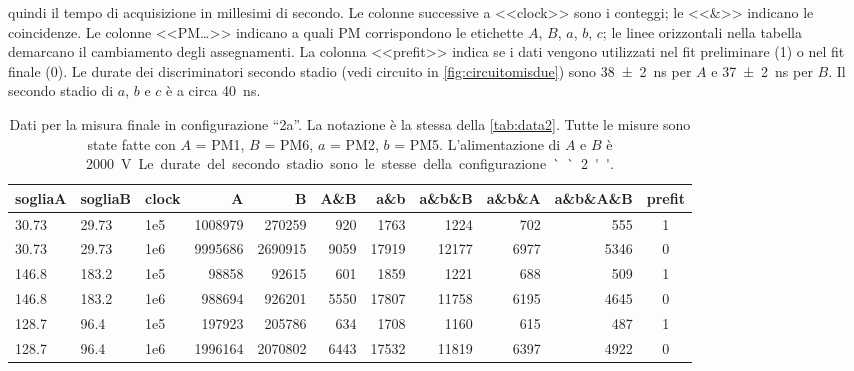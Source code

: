\begin{landscape}
\begin{table}[p]
{		quindi il tempo di acquisizione in millesimi di secondo.
		Le colonne successive a <<clock>> sono i conteggi; le <<\&>> indicano le coincidenze.
		Le colonne <<PM\dots>> indicano a quali PM corrispondono le etichette $A$, $B$, $a$, $b$, $c$;
		le linee orizzontali nella tabella demarcano il cambiamento degli assegnamenti.
		La colonna <<prefit>> indica se i dati vengono utilizzati nel fit preliminare (1) o nel fit finale (0).
		Le durate dei discriminatori secondo stadio (vedi circuito in \autoref{fig:circuitomisdue})
		sono \SI{38\pm2}{ns} per $A$ e \SI{37\pm2}{ns} per $B$.
		Il secondo stadio di $a$, $b$ e $c$ è a circa \SI{40}{ns}.}
	\end{table}
\end{landscape}

\begin{table}[p]
	\small
	\hspace{-5em}
	\begin{tabular}{ll|lrrrrrrr|c}
		sogliaA & sogliaB & clock & A & B & A\&B & a\&b & a\&b\&B & a\&b\&A & a\&b\&A\&B & prefit \\
		\hline
		30.73 & 29.73 & 1e5 & 1008979 & 270259 & 920 & 1763 & 1224 & 702 & 555  & 1               \\
		30.73 & 29.73 & 1e6 & 9995686 & 2690915 & 9059 & 17919 & 12177 & 6977 & 5346 & 0          \\
		146.8 & 183.2 & 1e5 & 98858 & 92615 & 601 & 1859 & 1221 & 688 & 509  & 1                    \\
		146.8 & 183.2 & 1e6 & 988694 & 926201 & 5550 & 17807 & 11758 & 6195 & 4645 & 0              \\
		128.7 & 96.4 & 1e5 & 197923 & 205786 & 634 & 1708 & 1160 & 615 & 487  & 1            \\
		128.7 & 96.4 & 1e6 & 1996164 & 2070802 & 6443 & 17532 & 11819 & 6397 & 4922 & 0      
	\end{tabular}
	\caption{\label{tab:data2a}
	Dati per la misura finale in configurazione ``2a''.
	La notazione è la stessa della \autoref{tab:data2}.
	Tutte le misure sono state fatte con $A$ = PM1, $B$ = PM6, $a$ = PM2, $b$ = PM5.
	L'alimentazione di $A$ e $B$ è \SI{2000}V.
	Le durate del secondo stadio sono le stesse della configurazione ``2''.}
\end{table}

